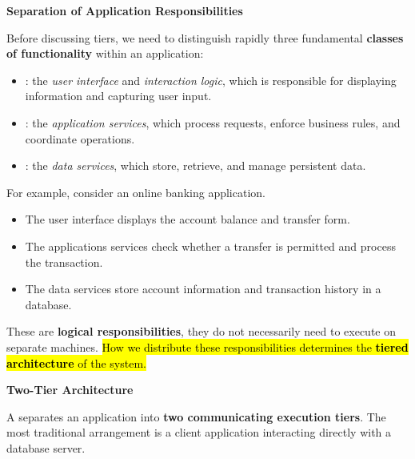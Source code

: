 \highspace
\begin{flushleft}
    \textcolor{Green3}{ \textbf{Separation of Application Responsibilities}}
\end{flushleft}
Before discussing tiers, we need to distinguish rapidly three fundamental \textbf{classes of functionality} within an application:
\begin{itemize}
    \item {}: the \emph{user interface} and \emph{interaction logic}, which is responsible for displaying information and capturing user input.
    \item {}: the \emph{application services}, which process requests, enforce business rules, and coordinate operations.
    \item {}: the \emph{data services}, which store, retrieve, and manage persistent data.
\end{itemize}
\begin{examplebox}
    For example, consider an online banking application.
    \begin{itemize}
        \item The user interface displays the account balance and transfer form.
        \item The applications services check whether a transfer is permitted and process the transaction.
        \item The data services store account information and transaction history in a database.
    \end{itemize}
    These are \textbf{logical responsibilities}, they do not necessarily need to execute on separate machines. \hl{How we distribute these responsibilities determines the \textbf{tiered architecture} of the system.}
\end{examplebox}

\newpage

\begin{flushleft}
    \textcolor{Green3}{ \textbf{Two-Tier Architecture}}
\end{flushleft}
A  separates an application into \textbf{two communicating execution tiers}. The most traditional arrangement is a client application interacting directly with a database server.


